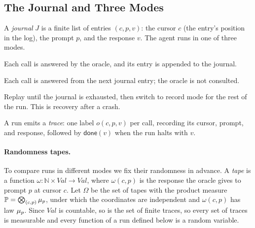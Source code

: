 \subsection{The Journal and Three Modes}
\label{sec:modes}

A \emph{journal} $J$ is a finite list of entries $(c, p, v)$: the cursor $c$ (the entry's
position in the log), the prompt $p$, and the response $v$.
The agent runs in one of three modes.
\begin{description}[noitemsep]
  \item[Record.] Each call is answered by the oracle, and its entry is appended to the journal.
  \item[Replay.] Each call is answered from the next journal entry; the oracle is not consulted.
  \item[Resume.] Replay until the journal is exhausted, then switch to record mode for the rest
    of the run. This is recovery after a crash.
\end{description}
A run emits a \emph{trace}: one label $o(c, p, v)$ per call, recording its cursor, prompt,
and response, followed by $\mathsf{done}(v)$ when the run halts with $v$.

\paragraph{Randomness tapes.}
To compare runs in different modes we fix their randomness in advance.
A \emph{tape} is a function $\omega : \mathbb{N} \times \mathit{Val} \to \mathit{Val}$, where
$\omega(c, p)$ is the response the oracle gives to prompt $p$ at cursor $c$.
Let $\Omega$ be the set of tapes with the product measure
$\mathbb{P} = \bigotimes_{(c,p)} \mu_{p}$, under which the coordinates are independent and
$\omega(c,p)$ has law $\mu_{p}$.
Since $\mathit{Val}$ is countable, so is the set of finite traces, so every set of traces is
measurable and every function of a run defined below is a random variable.

